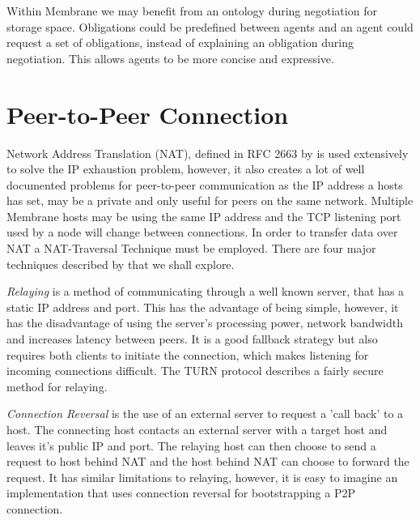 \documentclass[11pt, a4paper, twocolumn, twoside]{report}
\begin{document}
Within Membrane we may benefit from an ontology during negotiation for storage space. Obligations could be predefined between agents and an agent could request a set of obligations, instead of explaining an obligation during negotiation. This allows agents to be more concise and expressive.

\section{Peer-to-Peer Connection} \label{sec:p2pconn}

Network Address Translation (NAT), defined in RFC 2663 by \cite{srisuresh1999ip} is used extensively to solve the IP exhaustion problem, however, it also creates a lot of well documented problems for peer-to-peer communication as the IP address a hosts has set, may be a private and only useful for peers on the same network. Multiple Membrane hosts may be using the same IP address and the TCP listening port used by a node will change between connections. In order to transfer data over NAT a NAT-Traversal Technique must be employed. There are four major techniques described by \cite{ford2005peer} that we shall explore.

\emph{Relaying} is a method of communicating through a well known server, that has a static IP address and port. This has the advantage of being simple, however, it has the disadvantage of using the server's processing power, network bandwidth and increases latency between peers. It is a good fallback strategy but also requires both clients to initiate the connection, which makes listening for incoming connections difficult. The TURN protocol \citep{rosenberg2005traversal} describes a fairly secure method for relaying.

\emph{Connection Reversal} is the use of an external server to request a 'call back' to a host. The connecting host contacts an external server with a target host and leaves it's public IP and port. The relaying host can then choose to send a request to host behind NAT and the host behind NAT can choose to forward the request. It has similar limitations to relaying, however, it is easy to imagine an implementation that uses connection reversal for bootstrapping a P2P connection.
\end{document}
